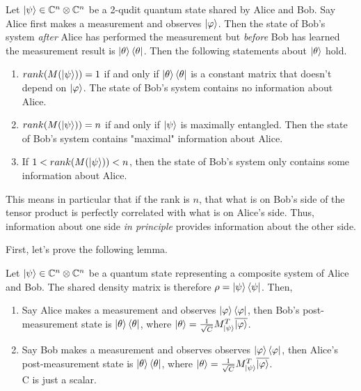 \begin{prop}
\label{entanglement-rank}
Let $\ket{\psi} \in \mathbb{C}^n \otimes \mathbb{C}^{n}$ be a 2-qudit quantum state shared by Alice and Bob. Say Alice first makes a measurement and observes $\ket{\varphi}$. Then the state of Bob's system \textit{after} Alice has performed the measurement but \textit{before} Bob has learned the measurement result is $\ket{\theta}\bra{\theta}$. Then the following statements about $\ket{\theta}$ hold.
\begin{enumerate}
    \item $rank(M(\ket{\psi}))=1$ if and only if $\ket{\theta}\bra{\theta}$ is a constant matrix that doesn't depend on $\ket{\varphi}$. The state of Bob's system contains no information about Alice.
    \item $rank(M(\ket{\psi}))=n$ if and only if $\ket{\psi}$ is maximally entangled. Then the state of Bob's system contains "maximal" information about Alice.
    \item If $1<rank(M(\ket{\psi}))<n$, then the state of Bob's system only contains some information about Alice.
\end{enumerate}
\end{prop}

This means in particular that if the rank is $n$, that what is on Bob's side of the tensor product is perfectly correlated with what is on Alice's side.  Thus, information about one side {\emph{in principle}} provides information about the other side. 

First, let's prove the following lemma.




\begin{lemma}
\label{end state lemma}
Let $\ket{\psi} \in \mathbb{C}^n \otimes \mathbb{C}^{n}$ be a quantum state representing a composite system of Alice and Bob.  The shared density matrix is therefore $\rho = \ket{\psi}\bra{\psi}$. Then,
\begin{enumerate}
\item Say Alice makes a measurement and observes $\ket{\varphi}\bra{\varphi}$, then Bob's post-measurement state is $\ket{\theta}\bra{\theta}$, where $\ket{\theta}=\frac{1}{\sqrt{C}}M_{\ket{\psi}}^T \overline{\ket{\varphi}}$.
\item Say Bob makes a measurement and observes observes $\ket{\varphi}\bra{\varphi}$, then Alice's post-measurement state is $\ket{\theta}\bra{\theta}$, where $\ket{\theta}=\frac{1}{\sqrt{C}}M_{\ket{\psi}}^T \overline{\ket{\varphi}}$.\\
C is just a scalar.
\end{enumerate}
\end{lemma}

